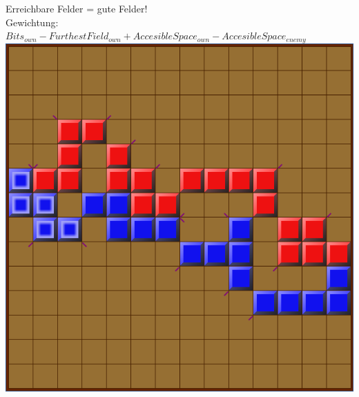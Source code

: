 \documentclass[12pt]{beamer}
\begin{document}
\begin{frame}
	Erreichbare Felder = gute Felder!\\
	Gewichtung: $Bits_{own} - FurthestField_{own} + AccesibleSpace_{own} - AccesibleSpace_{enemy}$\\
	\pause
	\includegraphics[width=0.6\linewidth]{media/wgh21.png}
\end{frame}
\end{document}
